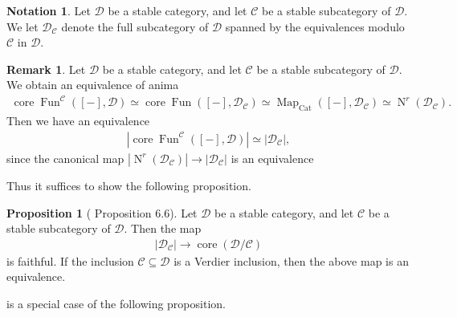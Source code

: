 \documentclass[a4paper,dvipdfmx,11pt,reqno]{amsart}
\DeclareMathOperator{\Map}{Map}
\DeclareMathOperator{\N}{N}
\DeclareMathOperator{\Fun}{Fun}
\newcommand{\C}{\mathcal{C}}
\newcommand{\D}{\mathcal{D}}
\newcommand{\I}{\mathcal{I}}
\DeclareMathOperator{\core}{core}
\newcommand{\Cat}{\mathrm{Cat}}
\newcommand{\Catst}{\mathrm{Cat^{st}}}
\theoremstyle{definition}
\newtheorem{lemma}[theorem]{Lemma}
\newtheorem{notation}[theorem]{Notation}
\newtheorem{proposition}[theorem]{Proposition}
\newtheorem{remark}[theorem]{Remark}
\begin{document}



\begin{notation}
  Let $\D$ be a stable category, and let $\C$ be a stable subcategory of $\D$.
  We let $\D_{\C}$ denote the full subcategory of $\D$ spanned by the equivalences modulo $\C$ in $\D$.
\end{notation}

\begin{remark}
  Let $\D$ be a stable category, and let $\C$ be a stable subcategory of $\D$.
  We obtain an equivalence of anima 
  \begin{align*}
    \core\Fun^{\C}([-],\D) 
    \simeq \core\Fun([-],\D_{\C})
    \simeq \Map_{\Cat}([-],\D_{\C})
    \simeq \N^r(\D_{\C}).
  \end{align*}
  Then we have an equivalence 
  \begin{align*}
    |\core\Fun^{\C}([-],\D)| \simeq |\D_{\C}|,
  \end{align*}
  since the canonical map $|\N^r(\D_{\C})| \to |\D_{\C}|$ is an equivalence
\end{remark}

Thus it suffices to show the following proposition.

\begin{proposition}[\cite{HLS23} Proposition 6.6] \label{HLS23.prop.6.6} 
  Let $\D$ be a stable category, and let $\C$ be a stable subcategory of $\D$.
  Then the map 
  \begin{align*}
    |\D_{\C}| \to \core(\D/\C)
  \end{align*}
  is faithful.
  If the inclusion $\C \subseteq \D$ is a Verdier inclusion, then the above map is an equivalence.
\end{proposition}

 is a special case of the following proposition.
\end{document}
